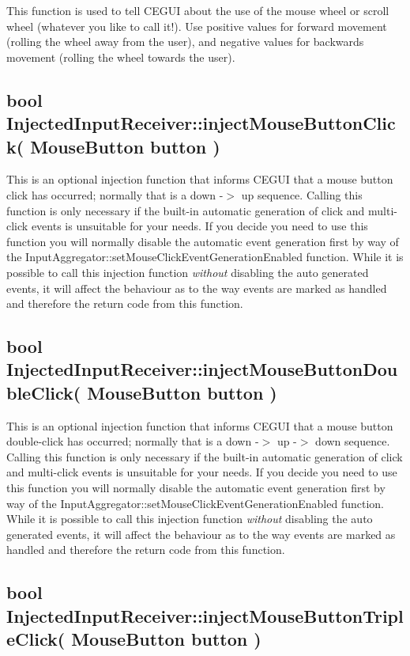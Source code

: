 This function is used to tell C\+E\+G\+UI about the use of the mouse wheel or scroll wheel (whatever you like to call it!). Use positive values for forward movement (rolling the wheel away from the user), and negative values for backwards movement (rolling the wheel towards the user).\hypertarget{input_tutorial_input_tutorial_click}{}\subsection{bool Injected\+Input\+Receiver\+::inject\+Mouse\+Button\+Click( Mouse\+Button button )}\label{input_tutorial_input_tutorial_click}
This is an optional injection function that informs C\+E\+G\+UI that a mouse button click has occurred; normally that is a down -\/$>$ up sequence. Calling this function is only necessary if the built-\/in automatic generation of click and multi-\/click events is unsuitable for your needs. If you decide you need to use this function you will normally disable the automatic event generation first by way of the Input\+Aggregator\+::set\+Mouse\+Click\+Event\+Generation\+Enabled function. While it is possible to call this injection function {\itshape without} disabling the auto generated events, it will affect the behaviour as to the way events are marked as \textquotesingle{}handled\textquotesingle{} and therefore the return code from this function.\hypertarget{input_tutorial_input_tutorial_doubleclick}{}\subsection{bool Injected\+Input\+Receiver\+::inject\+Mouse\+Button\+Double\+Click( Mouse\+Button button )}\label{input_tutorial_input_tutorial_doubleclick}
This is an optional injection function that informs C\+E\+G\+UI that a mouse button double-\/click has occurred; normally that is a down -\/$>$ up -\/$>$ down sequence. Calling this function is only necessary if the built-\/in automatic generation of click and multi-\/click events is unsuitable for your needs. If you decide you need to use this function you will normally disable the automatic event generation first by way of the Input\+Aggregator\+::set\+Mouse\+Click\+Event\+Generation\+Enabled function. While it is possible to call this injection function {\itshape without} disabling the auto generated events, it will affect the behaviour as to the way events are marked as \textquotesingle{}handled\textquotesingle{} and therefore the return code from this function.\hypertarget{input_tutorial_input_tutorial_tripleclick}{}\subsection{bool Injected\+Input\+Receiver\+::inject\+Mouse\+Button\+Triple\+Click( Mouse\+Button button )}\label{input_tutorial_input_tutorial_tripleclick}
